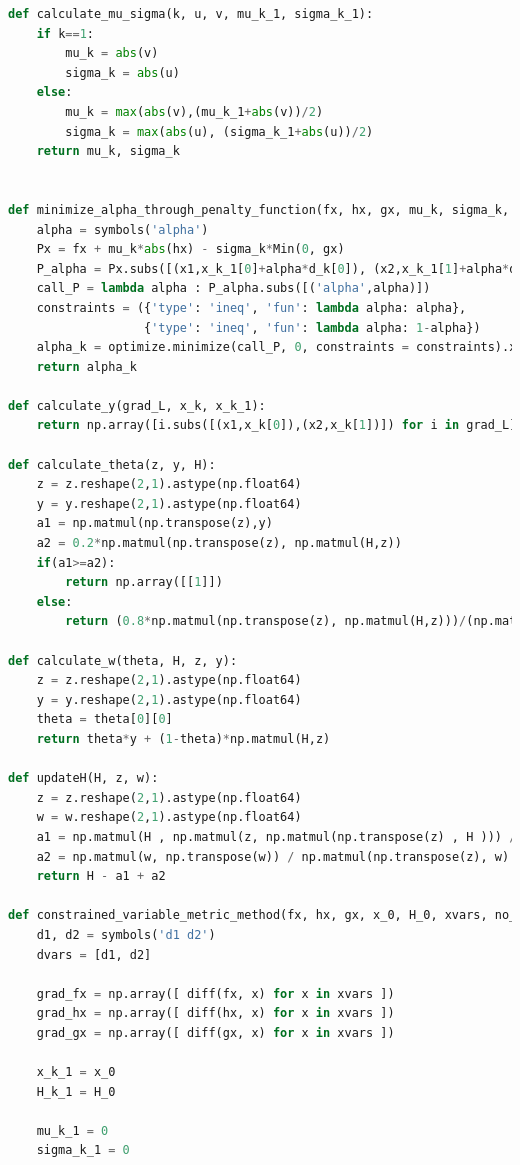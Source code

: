 \documentclass{article}
\begin{document}
\begin{lstlisting}[language=Python, caption=main.py]
def calculate_mu_sigma(k, u, v, mu_k_1, sigma_k_1):
    if k==1:
        mu_k = abs(v)
        sigma_k = abs(u)
    else:
        mu_k = max(abs(v),(mu_k_1+abs(v))/2)
        sigma_k = max(abs(u), (sigma_k_1+abs(u))/2)
    return mu_k, sigma_k


def minimize_alpha_through_penalty_function(fx, hx, gx, mu_k, sigma_k, x_k_1, d_k):
    alpha = symbols('alpha')
    Px = fx + mu_k*abs(hx) - sigma_k*Min(0, gx)
    P_alpha = Px.subs([(x1,x_k_1[0]+alpha*d_k[0]), (x2,x_k_1[1]+alpha*d_k[1])])
    call_P = lambda alpha : P_alpha.subs([('alpha',alpha)])
    constraints = ({'type': 'ineq', 'fun': lambda alpha: alpha},
                   {'type': 'ineq', 'fun': lambda alpha: 1-alpha})
    alpha_k = optimize.minimize(call_P, 0, constraints = constraints).x
    return alpha_k

def calculate_y(grad_L, x_k, x_k_1):
    return np.array([i.subs([(x1,x_k[0]),(x2,x_k[1])]) for i in grad_L]) - np.array([i.subs([(x1,x_k_1[0]),(x2,x_k_1[1])]) for i in grad_L])

def calculate_theta(z, y, H):
    z = z.reshape(2,1).astype(np.float64)
    y = y.reshape(2,1).astype(np.float64)
    a1 = np.matmul(np.transpose(z),y)
    a2 = 0.2*np.matmul(np.transpose(z), np.matmul(H,z))
    if(a1>=a2):
        return np.array([[1]])
    else:
        return (0.8*np.matmul(np.transpose(z), np.matmul(H,z)))/(np.matmul(np.transpose(z), np.matmul(H,z)) - np.matmul(np.transpose(z),y))

def calculate_w(theta, H, z, y):
    z = z.reshape(2,1).astype(np.float64)
    y = y.reshape(2,1).astype(np.float64)
    theta = theta[0][0]
    return theta*y + (1-theta)*np.matmul(H,z)

def updateH(H, z, w):
    z = z.reshape(2,1).astype(np.float64)
    w = w.reshape(2,1).astype(np.float64)
    a1 = np.matmul(H , np.matmul(z, np.matmul(np.transpose(z) , H ))) / np.matmul(np.transpose(z) , np.matmul(H, z) )
    a2 = np.matmul(w, np.transpose(w)) / np.matmul(np.transpose(z), w)
    return H - a1 + a2

def constrained_variable_metric_method(fx, hx, gx, x_0, H_0, xvars, no_of_iterations):
    d1, d2 = symbols('d1 d2')
    dvars = [d1, d2]

    grad_fx = np.array([ diff(fx, x) for x in xvars ])
    grad_hx = np.array([ diff(hx, x) for x in xvars ])
    grad_gx = np.array([ diff(gx, x) for x in xvars ])

    x_k_1 = x_0
    H_k_1 = H_0

    mu_k_1 = 0
    sigma_k_1 = 0


\end{lstlisting}
\end{document}
